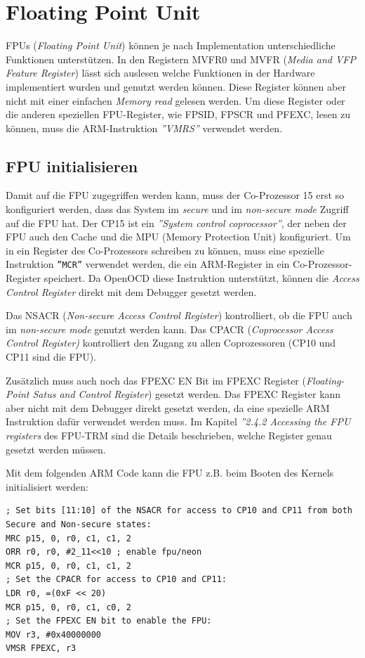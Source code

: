 \section{Floating Point Unit}
FPUs (\textit{Floating Point  Unit}) können je nach Implementation unterschiedliche Funktionen unterstützen.
In den Registern MVFR0 und MVFR (\textit{Media and VFP Feature Register}) lässt sich auslesen welche Funktionen in der Hardware implementiert wurden und genutzt werden können.
Diese Register können aber nicht mit einer einfachen \textit{Memory read} gelesen werden.
Um diese Register oder die anderen speziellen FPU-Register, wie FPSID, FPSCR und PFEXC, lesen zu können, muss die ARM-Instruktion \textit{''VMRS''} verwendet werden.

\subsection{FPU initialisieren}
Damit auf die FPU zugegriffen werden kann, muss der Co-Prozessor 15 erst so konfiguriert werden, dass das System im \textit{secure} und im \textit{non-secure mode} Zugriff auf die FPU hat.
Der CP15 ist ein \textit{''System control coprocessor''}, der neben der FPU auch den Cache und die MPU (Memory Protection Unit) konfiguriert.
Um in ein Register des Co-Prozessors schreiben zu können, muss eine spezielle Instruktion \texttt{''MCR''} verwendet werden, die ein ARM-Register in ein Co-Prozessor-Register speichert.
Da OpenOCD diese Instruktion unterstützt, können die \textit{Access Control Register} direkt mit dem Debugger gesetzt werden.

Das NSACR (\textit{Non-secure Access Control Register}) kontrolliert, ob die FPU auch im \textit{non-secure mode} genutzt werden kann.
Das CPACR (\textit{Coprocessor Access Control Register)} kontrolliert den Zugang zu allen Coprozessoren (CP10 und CP11 sind die FPU).

Zusätzlich muss auch noch das FPEXC EN Bit im FPEXC Register (\textit{Floating-Point Satus and Control Register}) gesetzt werden.
Das FPEXC Register kann aber nicht mit dem Debugger direkt gesetzt werden, da eine spezielle ARM Instruktion dafür verwendet werden muss.
Im Kapitel \textit{''2.4.2 Accessing the FPU registers} des FPU-TRM\cite{bib:FPUTechnicalReferenceManual} sind die Details beschrieben, welche Register genau gesetzt werden müssen.

Mit dem folgenden ARM Code kann die FPU z.B. beim Booten des Kernels initialisiert werden:

\lstset{language=[x86masm]Assembler}
\begin{lstlisting}[frame=single]
; Set bits [11:10] of the NSACR for access to CP10 and CP11 from both Secure and Non-secure states:
MRC p15, 0, r0, c1, c1, 2
ORR r0, r0, #2_11<<10 ; enable fpu/neon
MCR p15, 0, r0, c1, c1, 2
; Set the CPACR for access to CP10 and CP11:
LDR r0, =(0xF << 20)
MCR p15, 0, r0, c1, c0, 2
; Set the FPEXC EN bit to enable the FPU:
MOV r3, #0x40000000
VMSR FPEXC, r3
\end{lstlisting}


